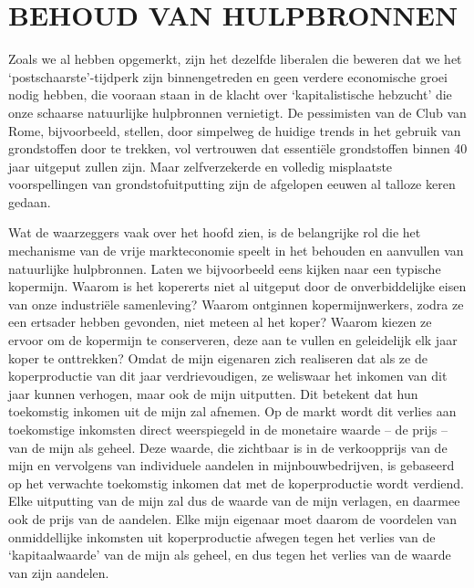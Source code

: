 \documentclass[
  a5paper,
  smalldemyvopaper,10pt,twoside,onecolumn,openright,extrafontsizes,hidelinks]{memoir}
\begin{document}
\section{BEHOUD VAN HULPBRONNEN}\label{behoud-van-hulpbronnen}

Zoals we al hebben opgemerkt, zijn het dezelfde liberalen die beweren
dat we het `postschaarste'-tijdperk zijn binnengetreden en geen verdere
economische groei nodig hebben, die vooraan staan in de klacht over
`kapitalistische hebzucht' die onze schaarse natuurlijke hulpbronnen
vernietigt. De pessimisten van de Club van Rome, bijvoorbeeld, stellen,
door simpelweg de huidige trends in het gebruik van grondstoffen door te
trekken, vol vertrouwen dat essentiële grondstoffen binnen 40 jaar
uitgeput zullen zijn. Maar zelfverzekerde en volledig misplaatste
voorspellingen van grondstofuitputting zijn de afgelopen eeuwen al
talloze keren gedaan.

Wat de waarzeggers vaak over het hoofd zien, is de belangrijke rol die
het mechanisme van de vrije markteconomie speelt in het behouden en
aanvullen van natuurlijke hulpbronnen. Laten we bijvoorbeeld eens kijken
naar een typische kopermijn. Waarom is het kopererts niet al uitgeput
door de onverbiddelijke eisen van onze industriële samenleving? Waarom
ontginnen kopermijnwerkers, zodra ze een ertsader hebben gevonden, niet
meteen al het koper? Waarom kiezen ze ervoor om de kopermijn te
conserveren, deze aan te vullen en geleidelijk elk jaar koper te
onttrekken? Omdat de mijn eigenaren zich realiseren dat als ze de
koperproductie van dit jaar verdrievoudigen, ze weliswaar het inkomen
van dit jaar kunnen verhogen, maar ook de mijn uitputten. Dit betekent
dat hun toekomstig inkomen uit de mijn zal afnemen. Op de markt wordt
dit verlies aan toekomstige inkomsten direct weerspiegeld in de
monetaire waarde -- de prijs -- van de mijn als geheel. Deze waarde, die
zichtbaar is in de verkoopprijs van de mijn en vervolgens van
individuele aandelen in mijnbouwbedrijven, is gebaseerd op het verwachte
toekomstig inkomen dat met de koperproductie wordt verdiend. Elke
uitputting van de mijn zal dus de waarde van de mijn verlagen, en
daarmee ook de prijs van de aandelen. Elke mijn eigenaar moet daarom de
voordelen van onmiddellijke inkomsten uit koperproductie afwegen tegen
het verlies van de `kapitaalwaarde' van de mijn als geheel, en dus tegen
het verlies van de waarde van zijn aandelen.
\end{document}
